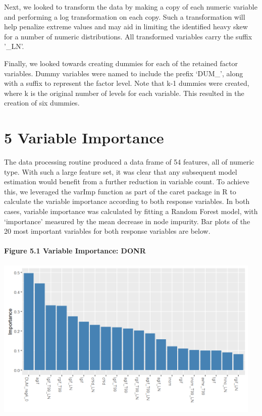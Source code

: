 \documentclass[]{article}
\let\oldparagraph\paragraph
\renewcommand{\paragraph}[1]{\oldparagraph{#1}\mbox{}}
\begin{document}
Next, we looked to transform the data by making a copy of each numeric
variable and performing a log transformation on each copy. Such a
transformation will help penalize extreme values and may aid in limiting
the identified heavy skew for a number of numeric distributions. All
transformed variables carry the suffix '\_LN'.

Finally, we looked towards creating dummies for each of the retained
factor variables. Dummy variables were named to include the prefix
`DUM\_', along with a suffix to represent the factor level. Note that
k-1 dummies were created, where k is the original number of levels for
each variable. This resulted in the creation of six dummies.

\section{5 Variable Importance}\label{variable-importance}

The data processing routine produced a data frame of 54 features, all of
numeric type. With such a large feature set, it was clear that any
subsequent model estimation would benefit from a further reduction in
variable count. To achieve this, we leveraged the varImp function as
part of the caret package in R to calculate the variable importance
according to both response variables. In both cases, variable importance
was calculated by fitting a Random Forest model, with `importance'
measured by the mean decrease in node impurity. Bar plots of the 20 most
important variables for both response variables are below.

\paragraph{Figure 5.1 Variable Importance:
DONR}\label{figure-5.1-variable-importance-donr}

\includegraphics[height=3.02083in]{images/varimp_resp.png}
\end{document}
